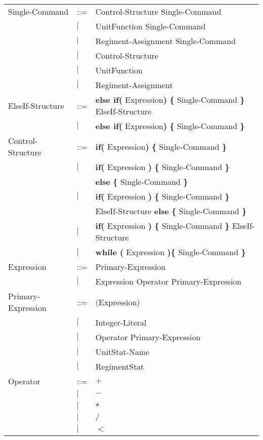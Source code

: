 \begin{center}
\begin{longtable}{l l l}
				Single-Command		&	::=	&Control-Structure Single-Command \\
									&$\mid$	& UnitFunction Single-Command\\
									&$\mid$	&Regiment-Assignment Single-Command\\
									&$\mid$	&Control-Structure \\
									&$\mid$	& UnitFunction \\
									&$\mid$	& Regiment-Assignment \\
				ElseIf-Structure	&	::=	&{\bf else if( } Expression{\bf )} {\bf \{ } Single-Command {\bf \} } ElseIf-Structure\\
									&$\mid$	&{\bf else if( } Expression{\bf )} {\bf \{ } Single-Command {\bf \} } \\
				Control-Structure	&	::=	&{\bf if( } Expression{\bf )} {\bf \{ } Single-Command {\bf \} }  \\
									&$\mid$	&{\bf if(} Expression {\bf )} {\bf \{ }Single-Command {\bf \}} \\
									&		&{\bf else } {\bf \{ }Single-Command {\bf \} } \\			
									&$\mid$	&{\bf if(} Expression {\bf )} {\bf \{ }Single-Command {\bf \}} \\
									&		&ElseIf-Structure {\bf else } {\bf \{ }Single-Command {\bf \} } \\
									&$\mid$	&{\bf if(} Expression {\bf )} {\bf \{ }Single-Command {\bf \}} ElseIf-Structure \\	
									&$\mid$	&{\bf while (} Expression {\bf )}{\bf \{ } Single-Command {\bf \}} \\
				Expression			&	::=	&Primary-Expression \\
									&$\mid$	&Expression Operator Primary-Expression \\
				Primary-Expression	&	::=	&(Expression)\\
									&$\mid$	&Integer-Literal \\
									&$\mid$	&Operator Primary-Expression\\
									&$\mid$	&UnitStat-Name \\
									&$\mid$	&RegimentStat \\
				Operator			&	::=	&$\boldsymbol {+}$\\
									&$\mid$	&$\boldsymbol {-}$\\
									&$\mid$	&$\boldsymbol {*}$\\
									&$\mid$	&$\boldsymbol {/}$\\
									&$\mid$	&$\boldsymbol {<}$\\

\end{longtable}
\end{center}

